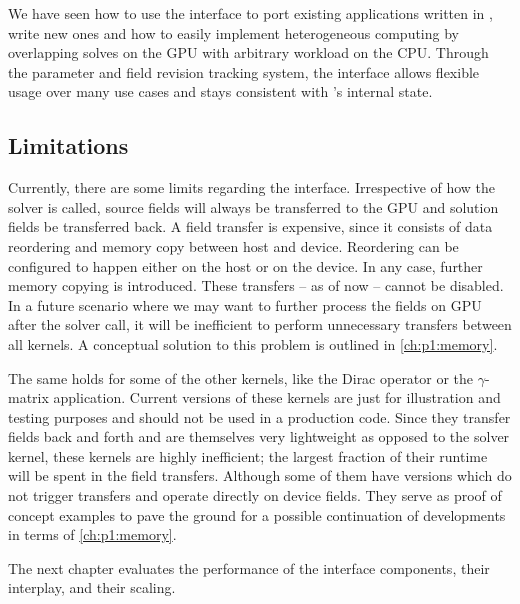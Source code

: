 We have seen how to use the interface to port existing applications written in \openqxd, write new ones and how to easily implement heterogeneous computing by overlapping solves on the GPU with arbitrary workload on the CPU.
Through the parameter and field revision tracking system, the interface allows flexible usage over many use cases and stays consistent with \openqxd's internal state.


\subsection{Limitations}

Currently, there are some limits regarding the interface.
Irrespective of how the solver is called, source fields will always be transferred to the GPU and solution fields be transferred back.
A field transfer is expensive, since it consists of data reordering and memory copy between host and device.
Reordering can be configured to happen either on the host or on the device.
In any case, further memory copying is introduced.
These transfers -- as of now -- cannot be disabled.
In a future scenario where we may want to further process the fields on GPU after the solver call, it will be inefficient to perform unnecessary transfers between all kernels.
A conceptual solution to this problem is outlined in \cref{ch:p1:memory}.

The same holds for some of the other kernels, like the Dirac operator or the $\gamma$-matrix application.
Current versions of these kernels are just for illustration and testing purposes and should not be used in a production code.
Since they transfer fields back and forth and are themselves very lightweight as opposed to the solver kernel, these kernels are highly inefficient; the largest fraction of their runtime will be spent in the field transfers.
Although some of them have versions which do not trigger transfers and operate directly on device fields.
They serve as proof of concept examples to pave the ground for a possible continuation of developments in terms of \cref{ch:p1:memory}.

The next chapter evaluates the performance of the interface components, their interplay, and their scaling.

